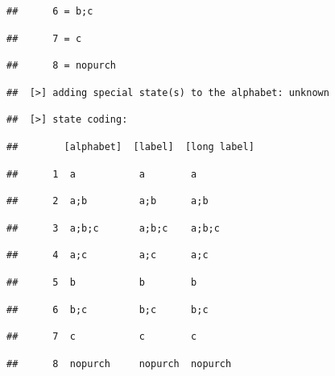 \documentclass[
]{book}
\begin{document}
\begin{verbatim}
##      6 = b;c
\end{verbatim}

\begin{verbatim}
##      7 = c
\end{verbatim}

\begin{verbatim}
##      8 = nopurch
\end{verbatim}

\begin{verbatim}
##  [>] adding special state(s) to the alphabet: unknown
\end{verbatim}

\begin{verbatim}
##  [>] state coding:
\end{verbatim}

\begin{verbatim}
##        [alphabet]  [label]  [long label]
\end{verbatim}

\begin{verbatim}
##      1  a           a        a
\end{verbatim}

\begin{verbatim}
##      2  a;b         a;b      a;b
\end{verbatim}

\begin{verbatim}
##      3  a;b;c       a;b;c    a;b;c
\end{verbatim}

\begin{verbatim}
##      4  a;c         a;c      a;c
\end{verbatim}

\begin{verbatim}
##      5  b           b        b
\end{verbatim}

\begin{verbatim}
##      6  b;c         b;c      b;c
\end{verbatim}

\begin{verbatim}
##      7  c           c        c
\end{verbatim}

\begin{verbatim}
##      8  nopurch     nopurch  nopurch
\end{verbatim}
\end{document}
